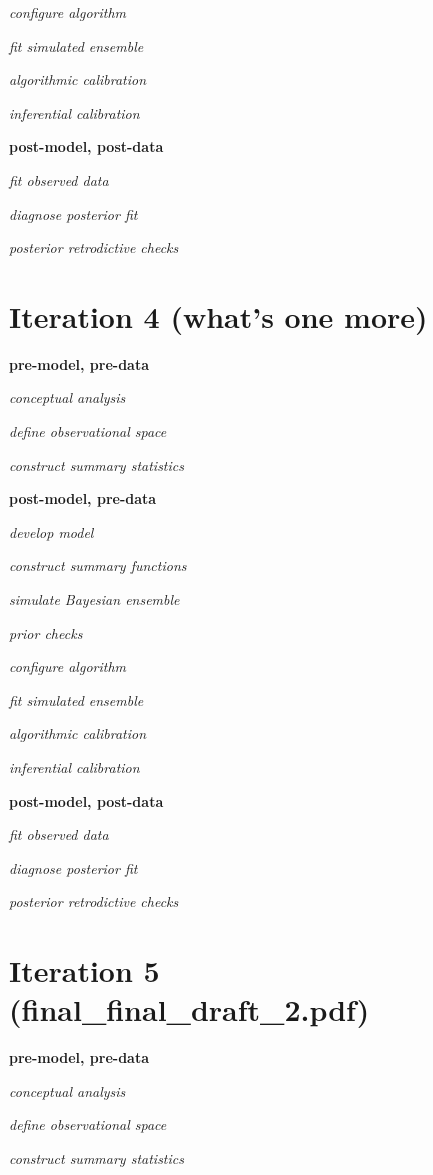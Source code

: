\documentclass[11pt, oneside, openany]{scrbook}
\begin{document}
\emph{configure algorithm}

\emph{fit simulated ensemble}

\emph{algorithmic calibration}

\emph{inferential calibration}

\textbf{post-model, post-data}

\emph{fit observed data}

\emph{diagnose posterior fit}

\emph{posterior retrodictive checks}

\hypertarget{iter4}{%
\section{Iteration 4 (what's one more)}\label{iter4}}

\textbf{pre-model, pre-data}

\emph{conceptual analysis}

\emph{define observational space}

\emph{construct summary statistics}

\textbf{post-model, pre-data}

\emph{develop model}

\emph{construct summary functions}

\emph{simulate Bayesian ensemble}

\emph{prior checks}

\emph{configure algorithm}

\emph{fit simulated ensemble}

\emph{algorithmic calibration}

\emph{inferential calibration}

\textbf{post-model, post-data}

\emph{fit observed data}

\emph{diagnose posterior fit}

\emph{posterior retrodictive checks}

\hypertarget{iter5}{%
\section{Iteration 5 (final\_final\_draft\_2.pdf)}\label{iter5}}

\textbf{pre-model, pre-data}

\emph{conceptual analysis}

\emph{define observational space}

\emph{construct summary statistics}
\end{document}
